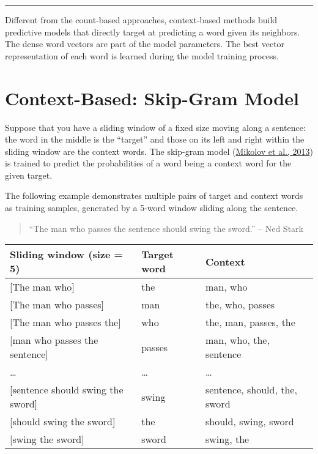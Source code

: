 \noindent\rule{\textwidth}{0.4pt}

Different from the count-based approaches, context-based methods build predictive models that directly target at predicting a word given its neighbors. The dense word vectors are part of the model parameters. The best vector representation of each word is learned during the model training process.

\section{Context-Based: Skip-Gram Model}

Suppose that you have a sliding window of a fixed size moving along a sentence: the word in the middle is the ``target'' and those on its left and right within the sliding window are the context words. The skip-gram model (\href{https://arxiv.org/pdf/1301.3781.pdf}{Mikolov et al., 2013}) is trained to predict the probabilities of a word being a context word for the given target.

The following example demonstrates multiple pairs of target and context words as training samples, generated by a 5-word window sliding along the sentence.

\begin{quote}
``The man who passes the sentence should swing the sword.'' -- Ned Stark
\end{quote}

\begin{table}[h]
\centering
\begin{tabular}{|l|l|l|}
\hline
\textbf{Sliding window (size = 5)} & \textbf{Target word} & \textbf{Context} \\
\hline
{[}The man who{]} & the & man, who \\
\hline
{[}The man who passes{]} & man & the, who, passes \\
\hline
{[}The man who passes the{]} & who & the, man, passes, the \\
\hline
{[}man who passes the sentence{]} & passes & man, who, the, sentence \\
\hline
\ldots & \ldots & \ldots \\
\hline
{[}sentence should swing the sword{]} & swing & sentence, should, the, sword \\
\hline
{[}should swing the sword{]} & the & should, swing, sword \\
\hline
{[}swing the sword{]} & sword & swing, the \\
\hline
\end{tabular}
\end{table}

